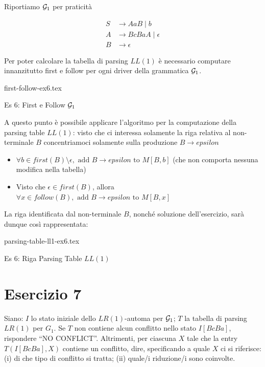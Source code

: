 \documentclass[class=book, crop=false, oneside, 12pt]{standalone}
\begin{document}
Riportiamo \(\mathcal{G}_1\) per praticità

\begin{align*}
    S &\to AaB \mid b \\
    A &\to BcBaA \mid \epsilon \\
    B &\to \epsilon
\end{align*}

Per poter calcolare la tabella di parsing \(LL(1)\) è necessario computare innanzitutto first e follow per ogni driver della grammatica \(\mathcal{G}_1\).

\begin{table}[H]
    \centering
    {first-follow-ex6.tex}
    \caption{Es 6: First e Follow \(\mathcal{G}_1\)}
    \label{tab:first-follow-ex6}
\end{table}

A questo punto è possibile applicare l'algoritmo per la computazione della parsing table \(LL(1)\): visto che ci interessa solamente la riga relativa al non-terminale \(B\) concentriamoci solamente sulla produzione \(B \to epsilon\)

\begin{itemize}
    \item \(\forall b \in first(B) \setminus \epsilon, \textrm{ add } B \to epsilon \textrm{ to } M[B, b]\) (che non comporta nessuna modifica nella tabella)
    \item Visto che \(\epsilon \in first(B)\), allora \(\forall x \in follow(B), \textrm{ add } B \to epsilon \textrm{ to } M[B, x]\)
\end{itemize}

La riga identificata dal non-terminale \(B\), nonché soluzione dell'esercizio, sarà dunque così rappresentata:

\begin{table}[H]
    \centering
    {parsing-table-ll1-ex6.tex}
    \caption{Es 6: Riga Parsing Table \(LL(1)\)}
    \label{tab:parsing-table-ll1-ex6}
\end{table}

\section*{Esercizio 7}

Siano: \(I\) lo stato iniziale dello \(LR(1)\)-automa per \(\mathcal{G}_1\); \(T\) la tabella di parsing \(LR(1)\) per \(G_1\).  Se \(T\) non contiene alcun conflitto nello stato \(I[BcBa]\), rispondere “NO CONFLICT”.  Altrimenti, per ciascuna \(X\) tale che la entry \(T(I[BcBa],X)\) contiene un conflitto, dire, specificando a quale \(X\) ci si riferisce:  (i) di che tipo di conflitto si tratta; (ii) quale/i riduzione/i sono coinvolte.
\end{document}

